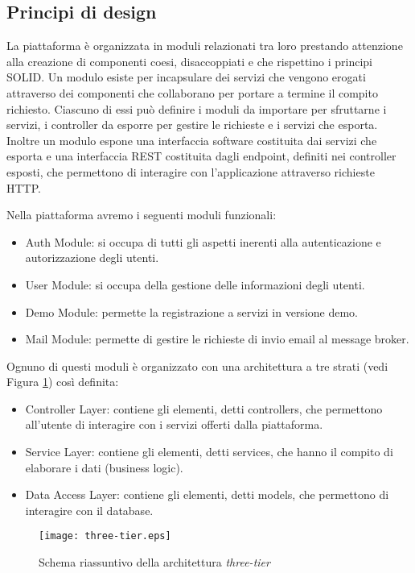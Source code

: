 \subsection{Principi di design}
La piattaforma è organizzata in moduli relazionati tra loro prestando attenzione
alla creazione di componenti coesi, disaccoppiati e che rispettino i principi SOLID.
Un modulo esiste per incapsulare dei servizi che vengono erogati attraverso dei componenti
che collaborano per portare a termine il compito richiesto. Ciascuno di essi può definire i moduli da importare per sfruttarne i servizi, i controller da esporre per gestire le richieste e i servizi che esporta.
Inoltre un modulo espone una interfaccia software costituita dai servizi che esporta e una interfaccia REST costituita dagli endpoint, definiti nei controller esposti,
che permettono di interagire con l'applicazione attraverso richieste HTTP.

Nella piattaforma avremo i seguenti moduli funzionali:
\begin{itemize}
    \itemsep0em
    \item Auth Module: si occupa di tutti gli aspetti inerenti alla autenticazione e autorizzazione degli utenti.
    \item User Module: si occupa della gestione delle informazioni degli utenti.
    \item Demo Module: permette la registrazione a servizi in versione demo.
    \item Mail Module: permette di gestire le richieste di invio email al message broker.
\end{itemize}
Ognuno di questi moduli è organizzato con una architettura a tre strati (vedi Figura \ref{fig:three-tier}) così definita:
\begin{itemize}
    \itemsep0em
    \item Controller Layer: contiene gli elementi, detti controllers, che permettono all'utente di interagire con i servizi offerti dalla piattaforma.
    \item Service Layer: contiene gli elementi, detti services, che hanno il compito di elaborare i dati (business logic).
    \item Data Access Layer: contiene gli elementi, detti models, che permettono di interagire con il database.
\end{itemize}

\begin{figure}[h]
    \centering
    \texttt{[image: three-tier.eps]}
    \caption{Schema riassuntivo della architettura \textit{three-tier}}
    \label{fig:three-tier}
\end{figure}


